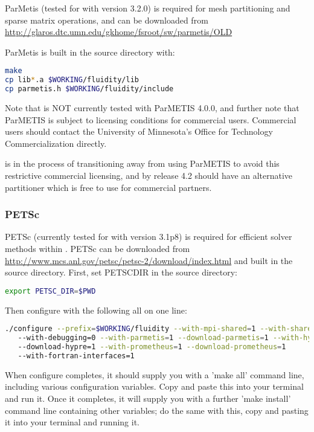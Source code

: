 ParMetis (tested for \fluidity with version 3.2.0) is required for mesh
partitioning and sparse matrix operations, and can be downloaded from
\url{http://glaros.dtc.umn.edu/gkhome/fsroot/sw/parmetis/OLD}

ParMetis is built in the source directory with:

\begin{lstlisting}[language=bash]
make
cp lib*.a $WORKING/fluidity/lib
cp parmetis.h $WORKING/fluidity/include
\end{lstlisting}

Note that \fluidity is NOT currently tested with ParMETIS 4.0.0, and further
note that ParMETIS is subject to licensing conditions for commercial users.
Commercial users should contact the University of Minnesota's Office for
Technology Commercialization directly. 

\fluidity is in the process of transitioning away from using ParMETIS to avoid
this restrictive commercial licensing, and by release 4.2 should have an
alternative partitioner which is free to use for commercial partners.

\subsubsection{PETSc}
\label{sec:required_libraries_numerical_petsc}

PETSc (currently tested for \fluidity with version 3.1p8) is required for
efficient solver methods within \fluidity. PETSc can be downloaded from
\url{http://www.mcs.anl.gov/petsc/petsc-2/download/index.html} and built in the
source directory. First, set PETSC{\textunderscore}DIR in the source directory:

\begin{lstlisting}[language=bash]
export PETSC_DIR=$PWD
\end{lstlisting}

Then configure with the following all on one line:

\begin{lstlisting}[language=bash]
./configure --prefix=$WORKING/fluidity --with-mpi-shared=1 --with-shared=1
   --with-debugging=0 --with-parmetis=1 --download-parmetis=1 --with-hypre=1
   --download-hypre=1 --with-prometheus=1 --download-prometheus=1
   --with-fortran-interfaces=1
\end{lstlisting}

When configure completes, it should supply you with a 'make all' command line,
including various configuration variables. Copy and paste this into your
terminal and run it. Once it completes, it will supply you with a further 'make
install' command line containing other variables; do the same with this, copy
and pasting it into your terminal and running it. 

